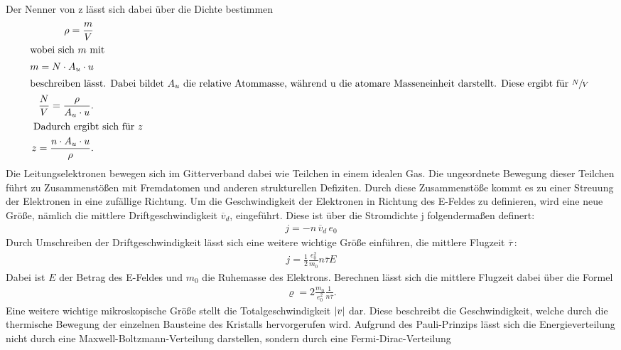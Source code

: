 Der Nenner von z lässt sich dabei über die Dichte bestimmen
\begin{subequations}
\begin{align}
    \rho = \frac{m}{V} \label{eq:4a} \\
    \intertext{wobei sich $m$ mit
    }
    m =N \cdot A_u \cdot u \label{eq:4b} \\
    \intertext{beschreiben lässt. Dabei bildet $A_u$ die relative Atommasse, während u die atomare Masseneinheit darstellt.
    Diese ergibt für $\sfrac{N}{V}$
    }
    \frac{N}{V}= \frac{\rho}{A_u \cdot u}.\label{eq:4c} \\
    \intertext{ Dadurch ergibt sich für $z$
    }
    z=\frac{n \cdot A_u \cdot u}{\rho}. \label{eq:4d}
\end{align}
\end{subequations}
Die Leitungselektronen bewegen sich im Gitterverband dabei wie Teilchen in einem idealen Gas.
Die ungeordnete Bewegung dieser Teilchen führt zu Zusammenstößen mit Fremdatomen und anderen
strukturellen Defiziten. Durch diese Zusammenstöße kommt es zu einer Streuung der
Elektronen in eine zufällige Richtung. Um die Geschwindigkeit der Elektronen in 
Richtung des E-Feldes zu definieren, wird eine neue Größe, nämlich die mittlere Driftgeschwindigkeit
$\overline{v} _d$, eingeführt. Diese ist über die Stromdichte j folgendermaßen definert: \cite{V311}
\begin{align}
    j = -n \, \overline{v} _d\, e_0 \label{eq:5}
\end{align}
Durch Umschreiben der Driftgeschwindigkeit lässt sich eine weitere wichtige Größe einführen,
die mittlere Flugzeit $\overline{\tau}\,$: \cite{V311}
\begin{align}
    j = \frac{1}{2}\frac{e_0^2}{m_0} n \overline{\tau} E \label{eq:6}
\end{align}
Dabei ist $E$ der Betrag des E-Feldes und $m_0$ die Ruhemasse des Elektrons.
Berechnen lässt sich die mittlere Flugzeit dabei über die Formel \cite{V311}
\begin{align}
\varrho = 2 \frac{m_0}{e_0^2}\frac{1}{n \overline{\tau}}. \label{eq:7}
\end{align}
Eine weitere wichtige mikroskopische Größe stellt die Totalgeschwindigkeit $\lvert v\rvert$ dar.
Diese beschreibt die Geschwindigkeit, welche durch die thermische Bewegung der einzelnen
Bausteine des Kristalls hervorgerufen wird. Aufgrund des Pauli-Prinzips lässt sich
die Energieverteilung nicht durch eine Maxwell-Boltzmann-Verteilung darstellen, 
sondern durch eine Fermi-Dirac-Verteilung \cite{V311}
